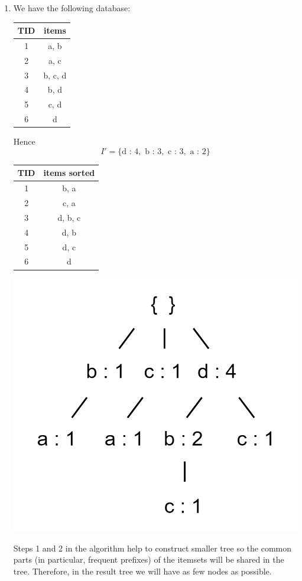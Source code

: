 \documentclass{article}
\begin{document}
\begin{enumerate}[label=(\roman*)]
    \item We have the following database:
    \begin{center}
      \begin{tabular}{|c|c|}
        \hline
        TID & items \\ \hline
        1 & a, b \\ \hline
        2 & a, c \\ \hline
        3 & b, c, d \\ \hline
        4 & b, d \\ \hline
        5 & c, d \\ \hline
        6 & d \\ \hline
      \end{tabular}
    \end{center}
    Hence
    $$I' = \{ \text{d : } 4, \text{ b : } 3,\text{ c : } 3, \text{ a : } 2 \}$$
    \begin{center}
      \begin{tabular}{|c|c|}
        \hline
        TID & items sorted \\ \hline
        1 & b, a \\ \hline
        2 & c, a \\ \hline
        3 & d, b, c \\ \hline
        4 & d, b \\ \hline
        5 & d, c \\ \hline
        6 & d \\ \hline
      \end{tabular}
    \end{center}
    \begin{center}\includegraphics[scale=0.3]{Task3_DS_b.png}
    \end{center}
    Steps 1 and 2 in the algorithm help to construct smaller tree so the common parts (in particular, frequent prefixes) of the itemsets will be shared in the tree. Therefore, in the result tree we will have as few nodes as possible.
  \end{enumerate}
\end{document}
